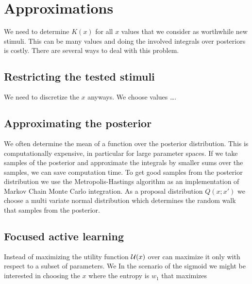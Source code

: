 
\section{Approximations} %
\label{sec:approximations}
We need to determine $K(x)$ for all $x$ values that we consider as worthwhile new stimuli. This can be many values and doing the involved integrals over posteriors is costly.
There are several ways to deal with this problem.

\subsection{Restricting the tested stimuli} %
\label{sub:restricting_the_tested_stimuli}
We need to discretize the $x$ anyways. We choose values \dots.

\subsection{Approximating the posterior} %
 \label{sub:approximating_the_posterior}
We often determine the mean of a function over the posterior distribution. This is computationally expensive, in particular for large parameter spaces.
If we take samples of the posterior and approximate the integrals by smaller sums over the samples, we can save computation time. To get good samples from the posterior distribution we use the Metropolis-Hastings algorithm as an implementation of Markov Chain Monte Carlo integration.
As a proposal distribution $Q(x;x')$ we choose a multi variate normal distribution which determines the random walk that samples from the posterior.

\subsection{Focused active learning} %
\label{sub:focused_active_learning}
Instead of maximizing the utility function $\mathcal{U}(x)$ over can maximize it only with respect to a subset of parameters.
We 
In the scenario of the sigmoid we might be interested in choosing the $x$ where the entropy is $w_1$ that maximizes 

